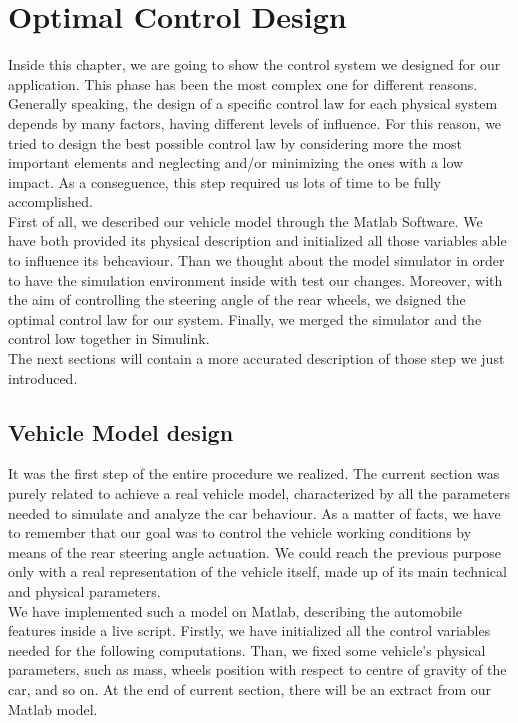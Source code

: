 \documentclass[a4paper,12pt,titlepage]{report}
\numberwithin{figure}{section}
\begin{document}
\chapter{Optimal Control Design}
Inside this chapter, we are going to show the control system we designed for our application. This phase has been the most complex one for different reasons. Generally speaking, the design of a specific control law for each physical system depends by many factors, having different levels of influence. For this reason, we tried to design the best possible control law by considering more the most important elements and neglecting and/or minimizing the ones with a low impact. As a conseguence, this step required us lots of time to be fully accomplished.\\
First of all, we described our vehicle model through the Matlab Software. We have both provided its physical description and initialized all those variables able to influence its behcaviour. Than we thought about the model simulator in order to have the simulation environment inside with test our changes. Moreover, with the aim of controlling the steering angle of the rear wheels, we dsigned the optimal control law for our system. Finally, we merged the simulator and the control low together in Simulink. \\
The next sections will contain a more accurated description of those step we just introduced.
\section{Vehicle Model design}
It was the first step of the entire procedure we realized. The current section was purely related to achieve a real vehicle model, characterized by all the  parameters needed to simulate and analyze the car behaviour. As a matter of facts, we have to remember that our goal was to control the vehicle working conditions by means of the rear steering angle actuation. We could reach the previous purpose only with a real representation of the vehicle itself, made up of its main technical and physical parameters.\\
We have implemented such a model on Matlab, describing the automobile features inside a live script. Firstly, we have initialized all the control variables needed for the following computations. Than, we fixed some vehicle's physical parameters, such as mass, wheels position with respect to centre of gravity of the car, and so on. At the end of current section, there will be an extract from our Matlab model.
\begin{figure} %
	\centering
\end{figure}
\end{document}
